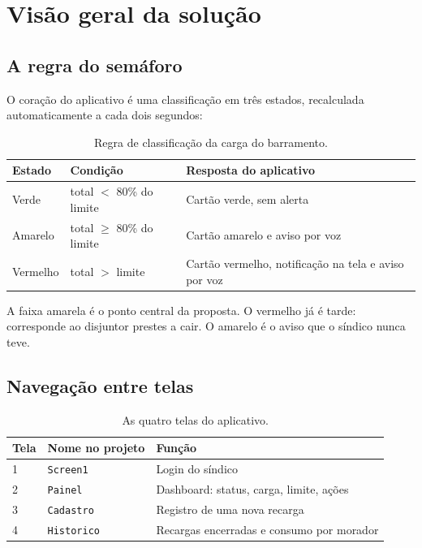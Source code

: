 \documentclass[12pt,a4paper]{article}
\newcommand{\comp}[1]{\texttt{#1}}
\begin{document}
\section{Visão geral da solução}

\subsection{A regra do semáforo}

O coração do aplicativo é uma classificação em três estados, recalculada automaticamente a
cada dois segundos:

\begin{table}[H]
\centering
\small
\begin{tabular}{@{}llp{7.2cm}@{}}
\toprule
\textbf{Estado} & \textbf{Condição} & \textbf{Resposta do aplicativo} \\
\midrule
Verde    & total $<$ 80\% do limite & Cartão verde, sem alerta \\
Amarelo  & total $\geq$ 80\% do limite & Cartão amarelo e aviso por voz \\
Vermelho & total $>$ limite & Cartão vermelho, notificação na tela e aviso por voz \\
\bottomrule
\end{tabular}
\caption{Regra de classificação da carga do barramento.}
\end{table}

A faixa amarela é o ponto central da proposta. O vermelho já é tarde: corresponde ao
disjuntor prestes a cair. O amarelo é o aviso que o síndico nunca teve.

\subsection{Navegação entre telas}

\begin{table}[H]
\centering
\small
\begin{tabular}{@{}llp{6.8cm}@{}}
\toprule
\textbf{Tela} & \textbf{Nome no projeto} & \textbf{Função} \\
\midrule
1 & \comp{Screen1}   & Login do síndico \\
2 & \comp{Painel}    & Dashboard: status, carga, limite, ações \\
3 & \comp{Cadastro}  & Registro de uma nova recarga \\
4 & \comp{Historico} & Recargas encerradas e consumo por morador \\
\bottomrule
\end{tabular}
\caption{As quatro telas do aplicativo.}
\end{table}
\end{document}

